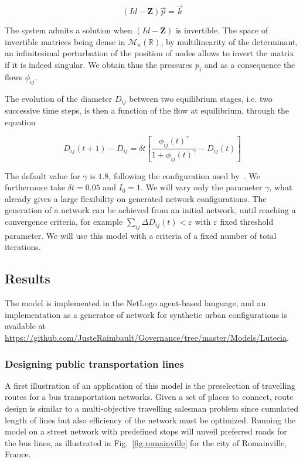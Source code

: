 \documentclass[runningheads,a4paper]{llncs}
\begin{document}
\begin{equation}
\left(Id - \mathbf{Z}\right) \vec{p} = \vec{k}
\end{equation}

The system admits a solution when $\left(Id - \mathbf{Z}\right)$ is invertible. The space of invertible matrices being dense in $\mathcal{M}_n(\mathbb{R})$, by multilinearity of the determinant, an infinitesimal perturbation of the position of nodes allows to invert the matrix if it is indeed singular. We obtain thus the pressures $p_i$ and as a consequence the flows $\phi_{ij}$.

The evolution of the diameter $D_{ij}$ between two equilibrium stages, i.e. two successive time steps, is then a function of the flow at equilibrium, through the equation

\begin{equation}
D_{ij} (t+1) - D_{ij} = \delta t \left[ \frac{\phi_{ij}(t)^\gamma}{1 + \phi_{ij}(t)^\gamma} - D_{ij}(t)\right]
\end{equation}

The default value for $\gamma$ is $1.8$, following the configuration used by~\cite{tero2010rules}. We furthermore take $\delta t = 0.05$ and $I_0 = 1$. We will vary only the parameter $\gamma$, what already gives a large flexibility on generated network configurations. The generation of a network can be achieved from an initial network, until reaching a convergence criteria, for example $\sum_{ij} \Delta D_{ij} (t) < \varepsilon$ with $\varepsilon$ fixed threshold parameter. We will use this model with a criteria of a fixed number of total iterations.


\subsection{Results}

The model is implemented in the NetLogo agent-based language, and an implementation as a generator of network for synthetic urban configurations is available at \url{https://github.com/JusteRaimbault/Governance/tree/master/Models/Lutecia}.


\subsubsection{Designing public transportation lines}

A first illustration of an application of this model is the preselection of travelling routes for a bus transportation networks. Given a set of places to connect, route design is similar to a multi-objective travelling salesman problem \cite{angus2007crowding} since cumulated length of lines but also efficiency of the network must be optimized. Running the model on a street network with predefined stops will unveil preferred roads for the bus lines, as illustrated in Fig.~\ref{fig:romainville} for the city of Romainville, France.
\end{document}
